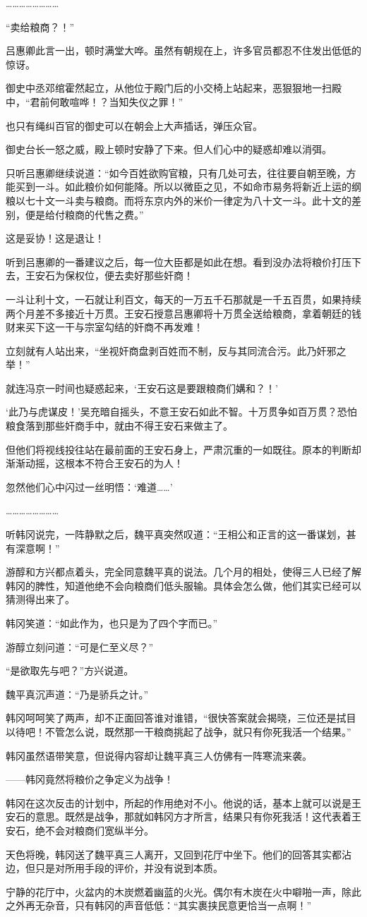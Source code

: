 ……………………

“卖给粮商？！”

吕惠卿此言一出，顿时满堂大哗。虽然有朝规在上，许多官员都忍不住发出低低的惊讶。

御史中丞邓绾霍然起立，从他位于殿门后的小交椅上站起来，恶狠狠地一扫殿中，“君前何敢喧哗！？当知失仪之罪！”

也只有绳纠百官的御史可以在朝会上大声插话，弹压众官。

御史台长一怒之威，殿上顿时安静了下来。但人们心中的疑惑却难以消弭。

只听吕惠卿继续说道：“如今百姓欲购官粮，只有几处可去，往往要自朝至晚，方能买到一斗。如此粮价如何能降。所以以微臣之见，不如命市易务将新近上运的纲粮以七十文一斗卖与粮商。而将东京内外的米价一律定为八十文一斗。此十文的差别，便是给付粮商的代售之费。”

这是妥协！这是退让！

听到吕惠卿的一番建议之后，每一位大臣都是如此在想。看到没办法将粮价打压下去，王安石为保权位，便去卖好那些奸商！

一斗让利十文，一石就让利百文，每天的一万五千石那就是一千五百贯，如果持续两个月差不多接近十万贯。王安石授意吕惠卿将十万贯全送给粮商，拿着朝廷的钱财来买下这一干与宗室勾结的奸商不再发难！

立刻就有人站出来，“坐视奸商盘剥百姓而不制，反与其同流合污。此乃奸邪之举！”

就连冯京一时间也疑惑起来，‘王安石这是要跟粮商们媾和？！’

‘此乃与虎谋皮！’吴充暗自摇头，不意王安石如此不智。十万贯争如百万贯？恐怕粮食落到那些奸商手中，就由不得王安石来做主了。

但他们将视线投往站在最前面的王安石身上，严肃沉重的一如既往。原本的判断却渐渐动摇，这根本不符合王安石的为人！

忽然他们心中闪过一丝明悟：‘难道……’

……………………

听韩冈说完，一阵静默之后，魏平真突然叹道：“王相公和正言的这一番谋划，甚有深意啊！”

游醇和方兴都点着头，完全同意魏平真的说法。几个月的相处，使得三人已经了解韩冈的脾性，知道他绝不会向粮商们低头服输。具体会怎么做，他们其实已经可以猜测得出来了。

韩冈笑道：“如此作为，也只是为了四个字而已。”

游醇立刻问道：“可是仁至义尽？”

“是欲取先与吧？”方兴说道。

魏平真沉声道：“乃是骄兵之计。”

韩冈呵呵笑了两声，却不正面回答谁对谁错，“很快答案就会揭晓，三位还是拭目以待吧！不管怎么说，既然那一干粮商挑起了战争，就只有你死我活一个结果。”

韩冈虽然语带笑意，但说得内容却让魏平真三人仿佛有一阵寒流来袭。

——韩冈竟然将粮价之争定义为战争！

韩冈在这次反击的计划中，所起的作用绝对不小。他说的话，基本上就可以说是王安石的意思。既然是战争，那就如韩冈方才所言，结果只有你死我活！这代表着王安石，绝不会对粮商们宽纵半分。

天色将晚，韩冈送了魏平真三人离开，又回到花厅中坐下。他们的回答其实都沾边，但只是对所用手段的评价，并没有说到本质。

宁静的花厅中，火盆内的木炭燃着幽蓝的火光。偶尔有木炭在火中噼啪一声，除此之外再无杂音，只有韩冈的声音低低：“其实裹挟民意更恰当一点啊！”

